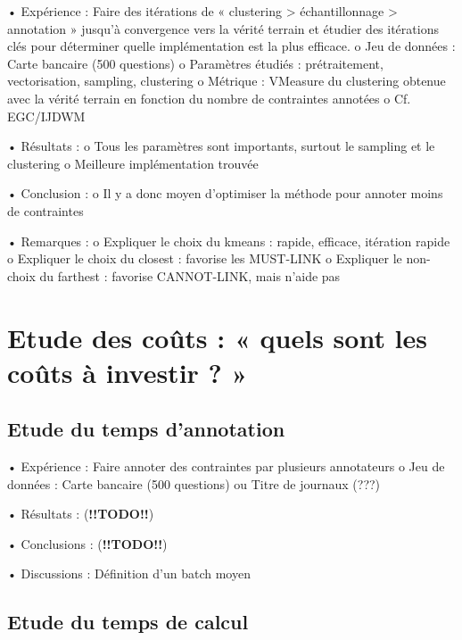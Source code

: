         •	Expérience : Faire des itérations de « clustering > échantillonnage > annotation » jusqu’à convergence vers la vérité terrain et étudier des itérations clés pour déterminer quelle implémentation est la plus efficace.
            o	Jeu de données : Carte bancaire (500 questions)
            o	Paramètres étudiés : prétraitement, vectorisation, sampling, clustering
            o	Métrique : VMeasure du clustering obtenue avec la vérité terrain en fonction du nombre de contraintes annotées
            o	Cf. EGC/IJDWM

        •	Résultats :
            o	Tous les paramètres sont importants, surtout le sampling et le clustering
            o	Meilleure implémentation trouvée

        •	Conclusion :
            o	Il y a donc moyen d’optimiser la méthode pour annoter moins de contraintes

        •	Remarques :
            o	Expliquer le choix du kmeans : rapide, efficace, itération rapide
            o	Expliquer le choix du closest : favorise les MUST-LINK
            o	Expliquer le non-choix du farthest : favorise CANNOT-LINK, mais n'aide pas

    \section{Etude des coûts : « quels sont les coûts à investir ? »}

        \subsection{Etude du temps d’annotation}

        •	Expérience : Faire annoter des contraintes par plusieurs annotateurs
            o	Jeu de données : Carte bancaire (500 questions) ou Titre de journaux (???)

        •	Résultats : (\textbf{!!TODO!!})
        
        •	Conclusions : (\textbf{!!TODO!!})

        •	Discussions : Définition d’un batch moyen


        \subsection{Etude du temps de calcul}

